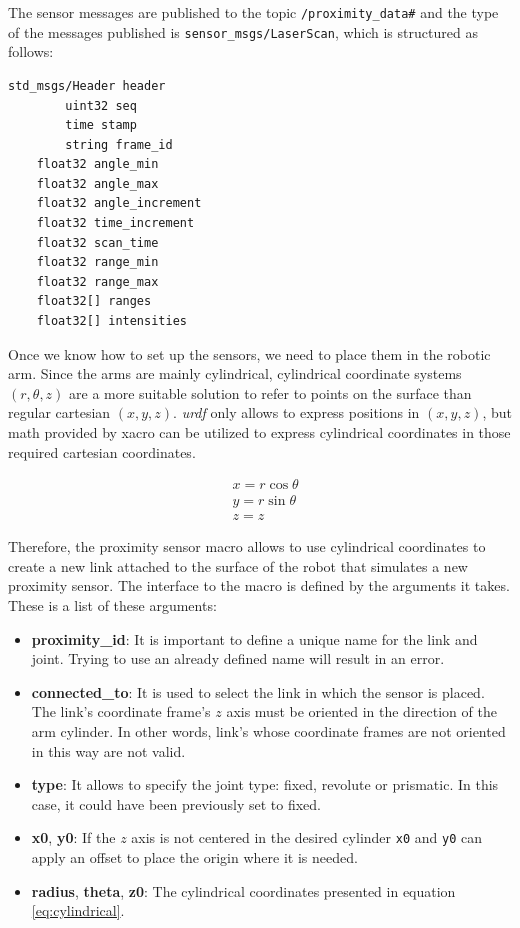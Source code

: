 The sensor messages are published to the topic \lstinline[columns=fixed]{/proximity_data#} and the type of the messages published is \lstinline[columns=fixed]{sensor_msgs/LaserScan}, which is structured as follows:


\begin{lstlisting}[caption={LaserScan message structure.},captionpos=b, numbers=none]
    std_msgs/Header header
        uint32 seq
        time stamp
        string frame_id
    float32 angle_min
    float32 angle_max
    float32 angle_increment
    float32 time_increment
    float32 scan_time
    float32 range_min
    float32 range_max
    float32[] ranges
    float32[] intensities
\end{lstlisting}

Once we know how to set up the sensors, we need to place them in the robotic arm. Since the arms are mainly cylindrical, cylindrical coordinate systems $(r,\theta, z)$ are a more suitable solution to refer to points on the surface than regular cartesian $(x, y, z)$. \textit{urdf} only allows to express positions in $(x, y, z)$, but math provided by xacro can be utilized to express cylindrical coordinates in those required cartesian coordinates.

\begin{equation}
    \label{eq:cylindrical}
    \begin{split}
& x = r \cos \theta \\
& y = r \sin \theta \\
& z = z
    \end{split}
\end{equation}

Therefore, the proximity sensor macro allows to use cylindrical coordinates to create a new link attached to the surface of the robot that simulates a new proximity sensor. The interface to the macro is defined by the arguments it takes. These is a list of these arguments:

\begin{itemize}
    \item \textbf{proximity\_id}: It is important to define a unique name for the link and joint. Trying to use an already defined name will result in an error.
    \item \textbf{connected\_to}: It is used to select the link in which the sensor is placed. The link's coordinate frame's $z$ axis must be oriented in the direction of the arm cylinder. In other words, link's whose coordinate frames are not oriented in this way are not valid.
    \item \textbf{type}: It allows to specify the joint type: fixed, revolute or prismatic. In this case, it could have been previously set to fixed.
    \item \textbf{x0}, \textbf{y0}: If the $z$ axis is not centered in the desired cylinder \lstinline[columns=fixed]{x0} and \lstinline[columns=fixed]{y0} can apply an offset to place the origin where it is needed.
    \item \textbf{radius}, \textbf{theta}, \textbf{z0}: The cylindrical coordinates presented in equation \ref{eq:cylindrical}.
\end{itemize}

